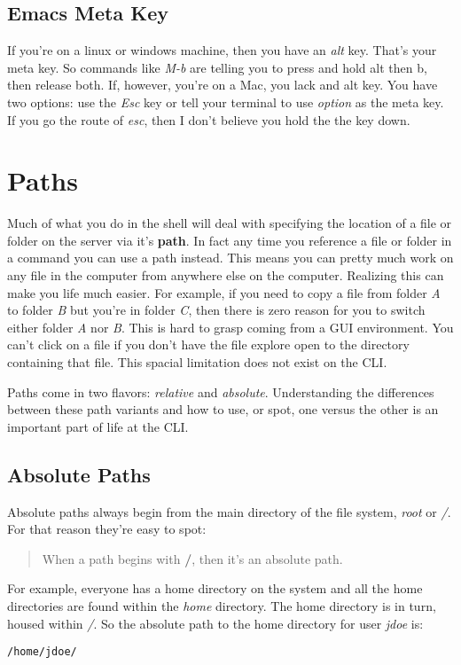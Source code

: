 \documentclass[nobib]{tufte-handout}
\begin{document}
\subsection{Emacs Meta Key}

If you're on a linux or windows machine, then you have an \textit{alt} key. That's your meta key. So commands like \textit{M-b} are telling you to press and hold alt then b, then release both. If, however, you're on a Mac, you lack and alt key. You have two options: use the \textit{Esc} key or tell your terminal to use \textit{option} as the meta key.  If you go the route of \textit{esc}, then I don't believe you hold the the key down.



\section{Paths}

Much of what you do in the shell will deal with specifying the location of a file or folder on the server via it's \textbf{path}. In fact any time you reference a file or folder in a command you can use a path instead. This means you can pretty much work on any file in the computer from anywhere else on the computer. Realizing this can make you life much easier. For example, if you need to copy a file from folder \textit{A} to folder \textit{B} but you're in folder \textit{C}, then there is zero reason for you to switch either folder \textit{A} nor \textit{B}. This is hard to grasp coming from a GUI environment. You can't click on a file if you don't have the file explore open to the directory containing that file.  This spacial limitation does not exist on the CLI\@.

Paths come in two flavors: \textit{relative} and \textit{absolute}. Understanding the differences between these path variants and how to use, or spot, one versus the other is an important part of life at the CLI\@.

\subsection{Absolute Paths}

Absolute paths always begin from the main directory of the file system, \textit{root} or \textit{/}.  For that reason they're easy to spot:
\begin{quote}
When a path begins with \textbf{/}, then it's an absolute path.
\end{quote}
For example, everyone has a home directory on the system and all the home directories are found within the \textit{home} directory. The home directory is in turn, housed within \textit{/}. So the absolute path to the home directory for user \textit{jdoe} is:
\begin{verbatim}
/home/jdoe/
\end{verbatim}
\end{document}
